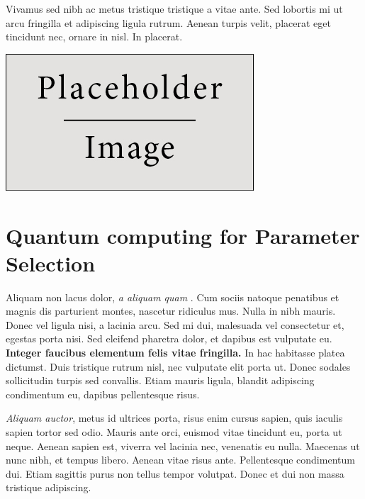 \documentclass[a0,portrait]{a0poster}
\begin{document}
\begin{multicols}{2}
Vivamus sed nibh ac metus tristique tristique a vitae ante. Sed lobortis mi ut arcu fringilla et adipiscing ligula rutrum. Aenean turpis velit, placerat eget tincidunt nec, ornare in nisl. In placerat.

\begin{center}\vspace{1cm}
\includegraphics[width=0.8\linewidth]{placeholder}
\end{center}\vspace{1cm}

\section*{Quantum computing for Parameter Selection}
Aliquam non lacus dolor, \textit{a aliquam quam} \cite{Smith:2012qr}. Cum sociis natoque penatibus et magnis dis parturient montes, nascetur ridiculus mus. Nulla in nibh mauris. Donec vel ligula nisi, a lacinia arcu. Sed mi dui, malesuada vel consectetur et, egestas porta nisi. Sed eleifend pharetra dolor, et dapibus est vulputate eu. \textbf{Integer faucibus elementum felis vitae fringilla.} In hac habitasse platea dictumst. Duis tristique rutrum nisl, nec vulputate elit porta ut. Donec sodales sollicitudin turpis sed convallis. Etiam mauris ligula, blandit adipiscing condimentum eu, dapibus pellentesque risus.

\textit{Aliquam auctor}, metus id ultrices porta, risus enim cursus sapien, quis iaculis sapien tortor sed odio. Mauris ante orci, euismod vitae tincidunt eu, porta ut neque. Aenean sapien est, viverra vel lacinia nec, venenatis eu nulla. Maecenas ut nunc nibh, et tempus libero. Aenean vitae risus ante. Pellentesque condimentum dui. Etiam sagittis purus non tellus tempor volutpat. Donec et dui non massa tristique adipiscing.
\color{SaddleBrown} %

\end{multicols}
\end{document}
